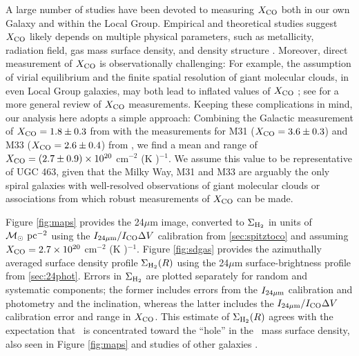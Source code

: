 \documentclass[apj,iop,numberedappendix]{emulateapj}
\begin{document}
A large number of studies have been devoted to measuring $X_{\rm CO}$ both in our own
Galaxy and within the Local Group.  Empirical and theoretical studies suggest
$X_{\rm CO}$ likely depends on multiple physical parameters, such as metallicity,
radiation field, gas mass surface density, and density structure
\citep{1996PASJ...48..275A, 1999ApJ...515...89M, 2002A&A...384...33B,
2006MNRAS.371.1865B, 2011arXiv1104.4118N}.  Moreover, direct measurement of
$X_{\rm CO}$ is observationally challenging: For example, the assumption of virial
equilibrium and the finite spatial resolution of giant molecular clouds, in even
Local Group galaxies, may both lead to inflated values of $X_{\rm CO}$
\citep{2007prpl.conf...81B, 2008ApJ...686..948B}; see
\citet{2008ApJ...686..948B} for a more general review of $X_{\rm CO}$ measurements.
Keeping these complications in mind, our analysis here adopts a simple approach:
Combining the Galactic measurement of $X_{\rm CO} = 1.8 \pm 0.3$ from
\citet{2001ApJ...547..792D} with the measurements for M31 ($X_{\rm CO} = 3.6 \pm 0.3$)
and M33 ($X_{\rm CO} = 2.6 \pm 0.4$) from \citet{2008ApJ...686..948B}, we find a mean
and range of $X_{\rm CO} = (2.7 \pm 0.9) \times 10^{20}$ cm$^{-2}$ (K \kms)$^{-1}$.
We assume this value to be representative of UGC 463, given that the Milky Way,
M31 and M33 are arguably the only spiral galaxies with well-resolved
observations of giant molecular clouds or associations from which robust
measurements of $X_{\rm CO}$ can be made.

Figure \ref{fig:maps} provides the 24$\mu$m image, converted to $\Sigma_{\rm H_2}$ in units
of $\mathcal{M}_\odot\ {\rm pc}^{-2}$ using the $I_{24\mu{\rm m}}/I_{\rm CO}\Delta V$ calibration from \sect
\ref{sec:spitztoco} and assuming $X_{\rm CO} = 2.7\times10^{20}$ cm$^{-2}$ (K
\kms)$^{-1}$.  Figure \ref{fig:sdgas} provides the azimuthally averaged surface
density profile $\Sigma_{\rm H_2}(R)$ using the 24$\mu$m surface-brightness profile from
\sect \ref{sec:24phot}.  Errors in $\Sigma_{\rm H_2}$ are plotted separately for random and
systematic components; the former includes errors from the $I_{24\mu{\rm m}}$ calibration
and photometry and the inclination, whereas the latter includes the $I_{24\mu{\rm m}}/I_{\rm CO}\Delta V$
calibration error and range in $X_{\rm CO}$.  This estimate of $\Sigma_{\rm H_2}(R)$ agrees with
the expectation that \molh\ is concentrated toward the ``hole'' in the \hone\
mass surface density, also seen in Figure \ref{fig:maps} and studies of other
galaxies \citepalias[e.g.,][]{2008AJ....136.2782L}.
\end{document}
